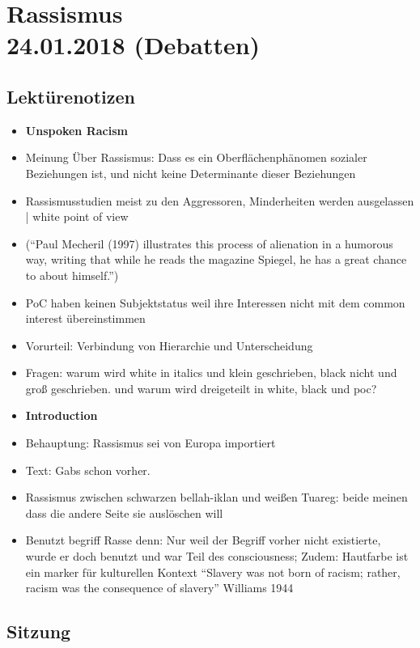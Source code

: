 \documentclass[emulatestandardclasses]{scrartcl}
\begin{document}
\section{Rassismus\\24.01.2018 (Debatten)}

\subsection{Lektürenotizen}

\begin{itemize}
  \item \textbf{Unspoken Racism}
  \item Meinung Über Rassismus: Dass es ein Oberflächenphänomen sozialer Beziehungen ist, und nicht keine Determinante dieser Beziehungen
  \item Rassismusstudien meist zu den Aggressoren, Minderheiten werden ausgelassen | white point of view 
  \item ("`Paul Mecheril (1997) illustrates this process of alienation in a humorous way, writing that while he reads the magazine Spiegel, he has a great chance to about himself."')
  \item PoC haben keinen Subjektstatus weil ihre Interessen nicht mit dem common interest übereinstimmen
  \item Vorurteil: Verbindung von Hierarchie und Unterscheidung
  \item Fragen: warum wird white in italics und klein geschrieben, black nicht und groß geschrieben. und warum wird dreigeteilt in white, black und poc?
  \item \textbf{Introduction}
  \item Behauptung: Rassismus sei von Europa importiert
  \item Text: Gabs schon vorher. 
  \item Rassismus zwischen schwarzen bellah-iklan und weißen Tuareg: beide meinen dass die andere Seite sie auslöschen will
  \item Benutzt begriff Rasse denn: Nur weil der Begriff vorher nicht existierte, wurde er doch benutzt und war Teil des consciousness; Zudem: Hautfarbe ist ein marker für kulturellen Kontext "`Slavery was not born of racism; rather, racism was the consequence of slavery"' Williams 1944
\end{itemize}

\subsection{Sitzung}
\end{document}
